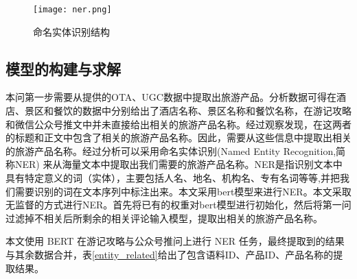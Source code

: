 \documentclass[bwprint]{gmcmthesis}
\begin{document}
\begin{figure}[!h]
  \centering
  \texttt{[image: ner.png]}
  \caption{命名实体识别结构}
  \label{ner}
  \end{figure}


\subsection{模型的构建与求解}
本问第一步需要从提供的OTA、UGC数据中提取出旅游产品。分析数据可得在酒店、景区和餐饮的数据中分别给出了酒店名称、景区名称和餐饮名称，在游记攻略和微信公众号推文中并未直接给出相关的旅游产品名称。经过观察发现，在这两者的标题和正文中包含了相关的旅游产品名称。因此，需要从这些信息中提取出相关的旅游产品名称。经过分析可以采用命名实体识别(Named Entity Recognition,简称NER) 来从海量文本中提取出我们需要的旅游产品名称。NER是指识别文本中具有特定意义的词（实体），主要包括人名、地名、机构名、专有名词等等,并把我们需要识别的词在文本序列中标注出来。本文采用bert模型来进行NER。本文采取无监督的方式进行NER。首先将已有的权重对bert模型进行初始化，然后将第一问过滤掉不相关后所剩余的相关评论输入模型，提取出相关的旅游产品名称。

本文使用 BERT 在游记攻略与公众号推问上进行 NER 任务，最终提取到的结果与其余数据合并，表\ref{entity_related}给出了包含语料ID、产品ID、产品名称的提取结果。
\newpage
\end{document}
